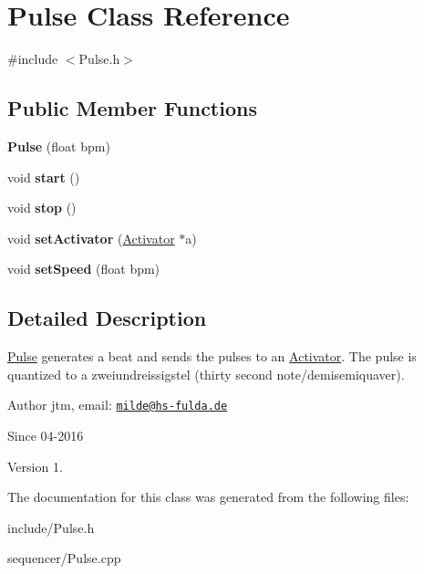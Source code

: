 \hypertarget{classPulse}{\section{Pulse Class Reference}
\label{classPulse}
}


{\ttfamily \#include $<$Pulse.\-h$>$}

\subsection*{Public Member Functions}
\begin{DoxyCompactItemize}
\item 
\hypertarget{classPulse_a9835b637db766732dd508c94fc30c501}{{\bfseries Pulse} (float bpm)}\label{classPulse_a9835b637db766732dd508c94fc30c501}

\item 
\hypertarget{classPulse_a164d81d4e1e798a5eec15b0b030b4047}{void {\bfseries start} ()}\label{classPulse_a164d81d4e1e798a5eec15b0b030b4047}

\item 
\hypertarget{classPulse_a7c8121986bec5319bb097216fe5e93d0}{void {\bfseries stop} ()}\label{classPulse_a7c8121986bec5319bb097216fe5e93d0}

\item 
\hypertarget{classPulse_a8283f4ab252e0c38b1e19a4dec522f23}{void {\bfseries set\-Activator} (\hyperlink{classActivator}{Activator} $\ast$a)}\label{classPulse_a8283f4ab252e0c38b1e19a4dec522f23}

\item 
\hypertarget{classPulse_afc87b2e4120c47942cf03fc82aaf8002}{void {\bfseries set\-Speed} (float bpm)}\label{classPulse_afc87b2e4120c47942cf03fc82aaf8002}

\end{DoxyCompactItemize}


\subsection{Detailed Description}
\hyperlink{classPulse}{Pulse} generates a beat and sends the pulses to an \hyperlink{classActivator}{Activator}. The pulse is quantized to a zweiundreissigstel (thirty second note/demisemiquaver).

\begin{DoxyAuthor}{Author}
jtm, email\-:  \href{mailto:milde@hs-fulda.de}{\tt milde@hs-\/fulda.\-de} 
\end{DoxyAuthor}
\begin{DoxySince}{Since}
04-\/2016 
\end{DoxySince}
\begin{DoxyVersion}{Version}
1. 
\end{DoxyVersion}


The documentation for this class was generated from the following files\-:\begin{DoxyCompactItemize}
\item 
include/Pulse.\-h\item 
sequencer/Pulse.\-cpp\end{DoxyCompactItemize}
